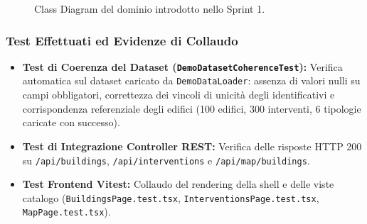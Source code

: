 \begin{figure}[H]
    \caption{Class Diagram del dominio introdotto nello Sprint 1.}
    \label{fig:class_sprint1}
\end{figure}

\subsubsection{Test Effettuati ed Evidenze di Collaudo}
\begin{itemize}[leftmargin=1.4em, itemsep=0.2em]
    \item \textbf{Test di Coerenza del Dataset (\texttt{DemoDatasetCoherenceTest}):} Verifica automatica sul dataset caricato da \texttt{DemoDataLoader}: assenza di valori nulli su campi obbligatori, correttezza dei vincoli di unicità degli identificativi e corrispondenza referenziale degli edifici (100 edifici, 300 interventi, 6 tipologie caricate con successo).
    \item \textbf{Test di Integrazione Controller REST:} Verifica delle risposte HTTP 200 su \texttt{/api/buildings}, \texttt{/api/interventions} e \texttt{/api/map/buildings}.
    \item \textbf{Test Frontend Vitest:} Collaudo del rendering della shell e delle viste catalogo (\texttt{BuildingsPage.test.tsx}, \texttt{InterventionsPage.test.tsx}, \texttt{MapPage.test.tsx}).
\end{itemize}

